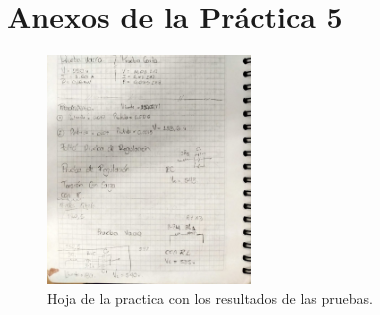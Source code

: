 \section{Anexos de la Práctica 5}


\begin{figure}[ht!] %
    \centering
    \includegraphics[width=0.48\textwidth]{fot/prac4_hoja de tales.jpg} %
    \caption{Hoja de la practica con los resultados de las pruebas.}
    \label{fig:hoja}
\end{figure}


